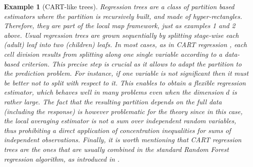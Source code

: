 \documentclass[paper=a4, fontsize=11pt]{scrartcl}
\newtheorem{example}{Example}
\begin{document}
\begin{example}[{CART-like trees}]
Regression trees are a class of partition based estimators where the partition is recursively built, and made of hyper-rectangles. Therefore, they are part of the local map framework, just as examples 1 and 2 above. Usual regression trees are grown sequentially by splitting stage-wise each (adult) leaf into two (children) leafs. In most cases, as in CART regression \citep{breiman1984classification}, each cell division results from splitting along one single variable according to a data-based criterion. This precise step is crucial as it allows to adapt the partition to the prediction problem. For instance, if one variable is not significant then it must be better not to split with respect to it. This enables to obtain a flexible regression estimator, which behaves well in many problems even when the dimension $d$ is rather large. The fact that the resulting partition depends on the full data (including the response) is however problematic for the theory since in this case, the local averaging estimator is not a sum over independent random variables, thus prohibiting a direct application of concentration inequalities for sums of independent observations. Finally, it is worth mentioning that CART regression trees are the ones that are usually combined in the standard Random Forest regression algorithm, as introduced in \cite{breiman2001random}.
 \end{example}
\end{document}
